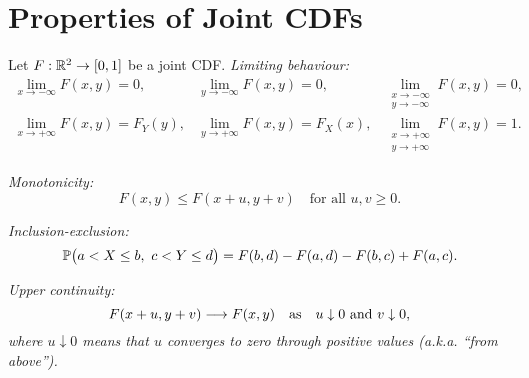 %


\section{Properties of Joint CDFs}

\begin{theorem}\label{thm:properties_jointcdf}
Let $F:\mathbb{R}^2\to [0,1]$ be a joint CDF.
\ben
\it Limiting behaviour:
\[\begin{array}{lll}
\lim_{x\to-\infty}F(x,y)=0, &
\lim_{y\to-\infty}F(x,y)=0, &
\lim_{\substack{x\to-\infty\\y\to-\infty}}F(x,y)=0, \\
\lim_{x\to+\infty}F(x,y)=F_Y(y), & 
\lim_{y\to+\infty}F(x,y)=F_X(x), &
\lim_{\substack{x\to+\infty\\y\to+\infty}} F(x,y)=1.
\end{array}\]

\it 	Monotonicity: 
\[
F(x,y)\leq F(x+u,y+v)\quad\text{for all $u,v\geq 0$.}
\]

\it Inclusion-exclusion:
\[
\mathbb{P}\big(a< X\leq b,\ c < Y\leq d\big) = F(b,d) - F(a,d) - F(b,c) + F(a,c).
\]

\it 	Upper continuity: 
\[
F(x+u,y+v) \longrightarrow F(x,y) \text{\quad as\quad} u\downarrow 0\text{ and }v\downarrow 0,
\]
where $u\downarrow 0$ means that $u$ converges to zero through positive values (a.k.a. ``from above'').
\een
\end{theorem}

